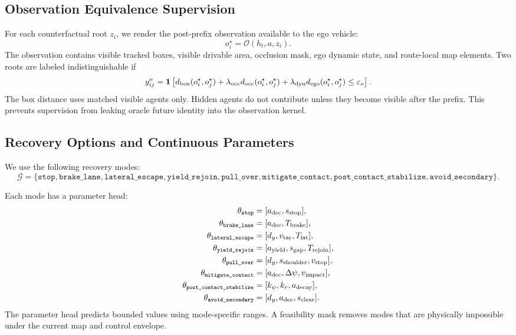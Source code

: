 \documentclass[conference]{IEEEtran}
\begin{document}
\subsection{Observation Equivalence Supervision}
\label{app:obs_labels}

For each counterfactual root $z_i$, we render the post-prefix observation available to the ego vehicle:
\begin{equation}
    o_i^\star =
    \mathcal{O}(h_t,a,z_i).
\end{equation}
The observation contains visible tracked boxes, visible drivable area, occlusion mask, ego dynamic state, and route-local map elements.  Two roots are labeled indistinguishable if
\begin{equation}
    y_{ij}^{o}
    =
    \mathbf{1}
    \left[
        d_{\rm box}(o_i^\star,o_j^\star)
        +
        \lambda_{\rm occ}d_{\rm occ}(o_i^\star,o_j^\star)
        +
        \lambda_{\rm dyn}d_{\rm ego}(o_i^\star,o_j^\star)
        \leq
        \varepsilon_o
    \right].
\end{equation}
The box distance uses matched visible agents only.  Hidden agents do not contribute unless they become visible after the prefix.  This prevents supervision from leaking oracle future identity into the observation kernel.

\subsection{Recovery Options and Continuous Parameters}
\label{app:recovery_modes}

We use the following recovery modes:
\begin{equation}
\mathcal{G}=
\{
\texttt{stop},
\texttt{brake\_lane},
\texttt{lateral\_escape},
\texttt{yield\_rejoin},
\texttt{pull\_over},
\texttt{mitigate\_contact},
\texttt{post\_contact\_stabilize},
\texttt{avoid\_secondary}
\}.
\end{equation}

Each mode has a parameter head:
\begin{align}
    \theta_{\texttt{stop}} &= [a_{\rm dec}, s_{\rm stop}], \\
    \theta_{\texttt{brake\_lane}} &= [a_{\rm dec}, T_{\rm brake}], \\
    \theta_{\texttt{lateral\_escape}} &= [d_y, v_{\rm tar}, T_{\rm lat}], \\
    \theta_{\texttt{yield\_rejoin}} &= [a_{\rm yield}, s_{\rm gap}, T_{\rm rejoin}], \\
    \theta_{\texttt{pull\_over}} &= [d_y, s_{\rm shoulder}, v_{\rm stop}], \\
    \theta_{\texttt{mitigate\_contact}} &= [a_{\rm dec}, \Delta \psi, v_{\rm impact}], \\
    \theta_{\texttt{post\_contact\_stabilize}} &= [k_\psi, k_r, a_{\rm decay}], \\
    \theta_{\texttt{avoid\_secondary}} &= [d_y, a_{\rm dec}, s_{\rm clear}].
\end{align}
The parameter head predicts bounded values using mode-specific ranges.  A feasibility mask removes modes that are physically impossible under the current map and control envelope.
\end{document}

